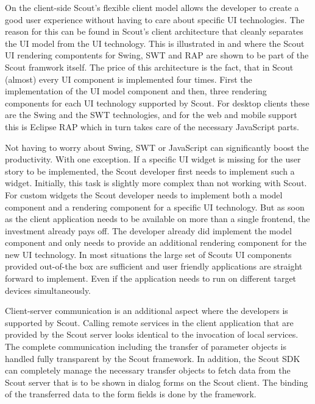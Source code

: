 \documentclass[a4paper,10pt,twoside]{book}
\begin{document}
On the client-side Scout's flexible client model allows the developer to create a good user experience without having to care about specific UI technologies. 
The reason for this can be found in Scout's client architecture that cleanly separates the UI model from the UI technology. 
This is illustrated in  and  where the Scout UI rendering compontents for Swing, SWT and RAP are shown to be part of the Scout framwork itself. 
The price of this architecture is the fact, that in Scout (almost) every UI component is implemented four times. 
First the implementation of the UI model component and then, three rendering components for each UI technology supported by Scout. 
For desktop clients these are the Swing and the SWT technologies, and for the web and mobile support this is Eclipse RAP which in turn takes care of the necessary JavaScript parts.  

Not having to worry about Swing, SWT or JavaScript can significantly boost the productivity.
With one exception. 
If a specific UI widget is missing for the user story to be implemented, the Scout developer first needs to implement such a widget. 
Initially, this task is slightly more complex than not working with Scout. 
For custom widgets the Scout developer needs to implement both a model component and a rendering component for a specific UI technology. 
But as soon as the client application needs to be available on more than a single frontend, the investment already pays off.
The developer already did implement the model component and only needs to provide an additional rendering component for the new UI technology.
In most situations the large set of Scouts UI components provided out-of-the box are sufficient and user friendly applications are straight forward to implement. 
Even if the application needs to run on different target devices simultaneously.

Client-server communication is an additional aspect where the developers is supported by Scout.
Calling remote services in the client application that are provided by the Scout server looks identical to the invocation of local services. 
The complete communication including the transfer of parameter objects is handled fully transparent by the Scout framework.
In addition, the Scout SDK can completely manage the necessary transfer objects to fetch data from the Scout server that is to be shown in dialog forms on the Scout client.
The binding of the transferred data to the form fields is done by the framework.
\end{document}
